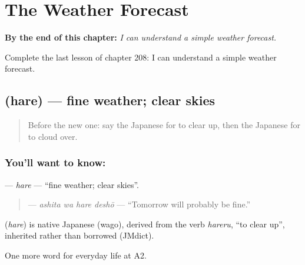
\chapter{The Weather Forecast}
\label{ch:ja-the-weather-forecast}

\begin{chapteropening}
\textbf{By the end of this chapter:} \emph{I can understand a simple weather forecast.}

Complete the last lesson of chapter 208: I can understand a simple weather forecast.
\end{chapteropening}

\section[\texorpdfstring{\ja{はれ} (hare)}{はれ (hare)}]{ (hare) — fine weather; clear skies}

\label{lesson:JA-C208-hare}



\begin{quote}
Before the new one: say the Japanese for to clear up, then the Japanese for to cloud over.
\end{quote}

\subsection*{You'll want to know: }
\textbf{} — \emph{hare} — \textquotedblleft{}fine weather; clear skies\textquotedblright{}.

\begin{quote}
\textbf{ } — \emph{ashita wa hare deshō} — \textquotedblleft{}Tomorrow will probably be fine.\textquotedblright{}
\end{quote}

\begin{cousinweb}
\textbf{} (\emph{hare}) is native Japanese (wago), derived from the verb \emph{hareru}, \textquotedblleft{}to clear up\textquotedblright{}, inherited rather than borrowed (JMdict).
\end{cousinweb}

\begin{grammarlens}[title={What you've built}]
One more word for everyday life at A2.
\end{grammarlens}

